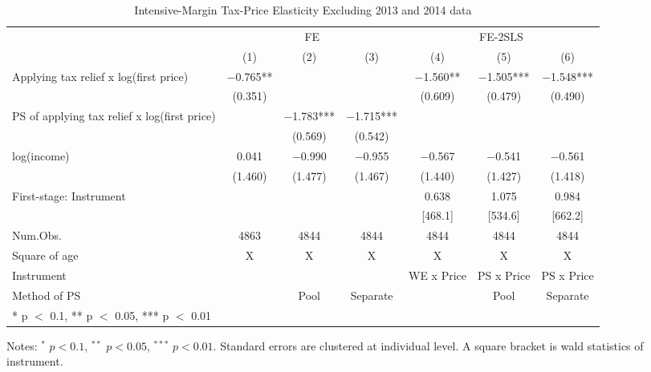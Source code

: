 \documentclass[
  11pt,
  a4paper,
]{article}
\begin{document}
\begin{table}[!h]

\caption{\label{tab:WoAnnoucementIntensive}Intensive-Margin Tax-Price Elasticity Excluding 2013 and 2014 data}
\centering
\fontsize{8}{10}\selectfont
\begin{threeparttable}
\begin{tabular}[t]{lcccccc}
\toprule
\multicolumn{1}{c}{ } & \multicolumn{3}{c}{FE} & \multicolumn{3}{c}{FE-2SLS} \\
\cmidrule(l{3pt}r{3pt}){2-4} \cmidrule(l{3pt}r{3pt}){5-7}
  & (1) & (2) & (3) & (4) & (5) & (6)\\
\midrule
Applying tax relief x log(first price) & \num{-0.765}** &  &  & \num{-1.560}** & \num{-1.505}*** & \num{-1.548}***\\
 & (\num{0.351}) &  &  & (\num{0.609}) & (\num{0.479}) & (\num{0.490})\\
PS of applying tax relief x log(first price) &  & \num{-1.783}*** & \num{-1.715}*** &  &  & \\
 &  & (\num{0.569}) & (\num{0.542}) &  &  & \\
log(income) & \num{0.041} & \num{-0.990} & \num{-0.955} & \num{-0.567} & \num{-0.541} & \num{-0.561}\\
 & (\num{1.460}) & (\num{1.477}) & (\num{1.467}) & (\num{1.440}) & (\num{1.427}) & (\num{1.418})\\
\midrule
First-stage: Instrument &  &  &  & 0.638 & 1.075 & 0.984\\
 &  &  &  & [468.1] & [534.6] & [662.2]\\
Num.Obs. & \num{4863} & \num{4844} & \num{4844} & \num{4844} & \num{4844} & \num{4844}\\
Square of age & X & X & X & X & X & X\\
Instrument &  &  &  & WE x Price & PS x Price & PS x Price\\
Method of PS &  & Pool & Separate &  & Pool & Separate\\
\bottomrule
\multicolumn{7}{l}{\rule{0pt}{1em}* p $<$ 0.1, ** p $<$ 0.05, *** p $<$ 0.01}\\
\end{tabular}
\begin{tablenotes}
\item Notes: $^{*}$ $p < 0.1$, $^{**}$ $p < 0.05$, $^{***}$ $p < 0.01$. Standard errors are clustered at individual level. A square bracket is wald statistics of instrument.
\end{tablenotes}
\end{threeparttable}
\end{table}
\end{document}
